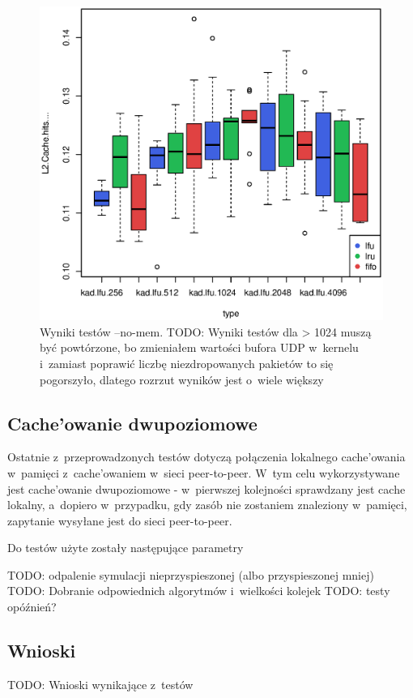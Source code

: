 \documentclass[a4paper,11pt]{scrartcl}
\newcommand{\s}{ }
\newcommand{\kesz}{cache}
\newcommand{\keszowania}{cache'owania}
\newcommand{\keszowanie}{cache'owanie}
\newcommand{\Keszowanie}{Cache'owanie}
\newcommand{\keszowaniem}{cache'owaniem}
\begin{document}
\begin{figure}[h!]
\includegraphics[width=0.95\linewidth]{img/cache.eps}
\caption{Wyniki testów --no-mem. TODO: Wyniki testów dla > 1024 muszą być powtórzone, bo zmieniałem wartości bufora UDP w~kernelu i~zamiast poprawić liczbę niezdropowanych pakietów to się pogorszyło, dlatego rozrzut wyników jest o~wiele większy}
\end{figure}


\subsection{\Keszowanie\s dwupoziomowe}
Ostatnie z~przeprowadzonych testów dotyczą połączenia lokalnego \keszowania\s w~pamięci z~\keszowaniem\s w~sieci peer-to-peer. W~tym celu wykorzystywane jest \keszowanie\s dwupoziomowe - w~pierwszej kolejności sprawdzany jest \kesz\s lokalny, a~dopiero w~przypadku, gdy zasób nie zostaniem znaleziony w~pamięci, zapytanie wysyłane jest do sieci peer-to-peer.

Do testów użyte zostały następujące parametry

TODO: odpalenie symulacji nieprzyspieszonej (albo przyspieszonej mniej)
TODO: Dobranie odpowiednich algorytmów i~wielkości kolejek
TODO: testy opóźnień?

\subsection{Wnioski}
TODO: Wnioski wynikające z~testów
\end{document}
